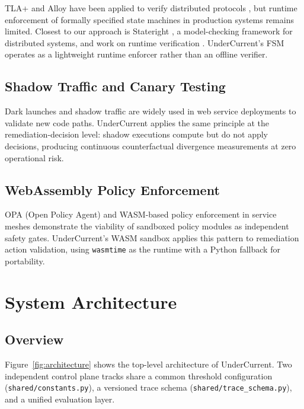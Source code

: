 \documentclass[runningheads]{llncs}
\begin{document}
TLA+ and Alloy have been applied to verify distributed protocols
\cite{lamport2002specifying}, but runtime enforcement of formally
specified state machines in production systems remains limited.
Closest to our approach is Stateright \cite{stateright2021}, a
model-checking framework for distributed systems, and work on
runtime verification \cite{leucker2009brief}. UnderCurrent's FSM
operates as a lightweight runtime enforcer rather than an offline
verifier.

\subsection{Shadow Traffic and Canary Testing}

Dark launches and shadow traffic \cite{fowler2014dark} are widely used
in web service deployments to validate new code paths. UnderCurrent
applies the same principle at the remediation-decision level: shadow
executions compute but do not apply decisions, producing continuous
counterfactual divergence measurements at zero operational risk.

\subsection{WebAssembly Policy Enforcement}

OPA (Open Policy Agent) \cite{opa2016} and WASM-based policy enforcement
in service meshes \cite{Envoy2022wasm} demonstrate the viability of
sandboxed policy modules as independent safety gates.
UnderCurrent's WASM sandbox applies this pattern to remediation
action validation, using \texttt{wasmtime} as the runtime with a
Python fallback for portability.

\section{System Architecture}
\label{sec:architecture}

\subsection{Overview}

Figure~\ref{fig:architecture} shows the top-level architecture of
UnderCurrent. Two independent control plane tracks share a common
threshold configuration ({\small\texttt{shared/constants.py}}),
a versioned trace schema ({\small\texttt{shared/trace\_schema.py}}),
and a unified evaluation layer.
\end{document}
